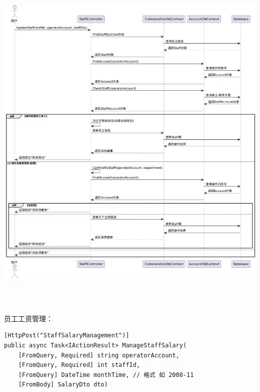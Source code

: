 \documentclass[]{article}
\let\oldincludegraphics\includegraphics
\renewcommand{\includegraphics}[2][]{%
  \begin{center}\oldincludegraphics[#1]{#2}\end{center}%
}
\begin{document}
\includegraphics[width=6.20625in,height=6.7625in]{media/media/image17.png}

员工工资管理：
\begin{verbatim}
[HttpPost("StaffSalaryManagement")]
public async Task<IActionResult> ManageStaffSalary(
    [FromQuery, Required] string operatorAccount,
    [FromQuery, Required] int staffId,
    [FromQuery] DateTime monthTime, // 格式 如 2008-11
    [FromBody] SalaryDto dto)
\end{verbatim}
\end{document}
